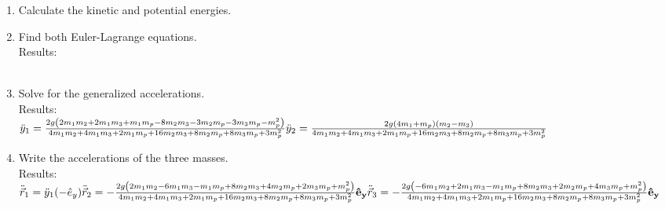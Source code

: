 \documentclass[11pt, a4paper, twoside]{article}
\begin{document}
\begin{enumerate}
		\begin{enumerate}
			\item Calculate the kinetic and potential energies.
			\item Find both Euler-Lagrange equations.\\
			Results:\\
			\\
			\item Solve for the generalized accelerations.\\
			Results:\\
			\(
				\ddot{y}_{1} = \frac{2 g \left(2 m_{1} m_{2} + 2 m_{1} m_{3} + m_{1} m_{p} - 8 m_{2} m_{3} - 3 m_{2} m_{p} - 3 m_{3} m_{p} - m_{p}^{2}\right)}{4 m_{1} m_{2} + 4 m_{1} m_{3} + 2 m_{1} m_{p} + 16 m_{2} m_{3} + 8 m_{2} m_{p} + 8 m_{3} m_{p} + 3 m_{p}^{2}}\\
				\ddot{y}_{2} = \frac{2 g \left(4 m_{1} + m_{p}\right) \left(m_{2} - m_{3}\right)}{4 m_{1} m_{2} + 4 m_{1} m_{3} + 2 m_{1} m_{p} + 16 m_{2} m_{3} + 8 m_{2} m_{p} + 8 m_{3} m_{p} + 3 m_{p}^{2}}
			\)
			\item Write the accelerations of the three masses.\\
			Results:\\
			\(
				\ddot{\vec{r}}_{1} = \ddot{y}_1 (- \hat{e}_y)\\
				\ddot{\vec{r}}_{2} = -  \frac{2 g \left(2 m_{1} m_{2} - 6 m_{1} m_{3} - m_{1} m_{p} + 8 m_{2} m_{3} + 4 m_{2} m_{p} + 2 m_{3} m_{p} + m_{p}^{2}\right)}{4 m_{1} m_{2} + 4 m_{1} m_{3} + 2 m_{1} m_{p} + 16 m_{2} m_{3} + 8 m_{2} m_{p} + 8 m_{3} m_{p} + 3 m_{p}^{2}}\mathbf{\hat{e}_y} \\
				\ddot{\vec{r}}_{3} = -  \frac{2 g \left(- 6 m_{1} m_{2} + 2 m_{1} m_{3} - m_{1} m_{p} + 8 m_{2} m_{3} + 2 m_{2} m_{p} + 4 m_{3} m_{p} + m_{p}^{2}\right)}{4 m_{1} m_{2} + 4 m_{1} m_{3} + 2 m_{1} m_{p} + 16 m_{2} m_{3} + 8 m_{2} m_{p} + 8 m_{3} m_{p} + 3 m_{p}^{2}}\mathbf{\hat{e}_y}
				\) 
		\end{enumerate}

\end{enumerate}
\end{document}
